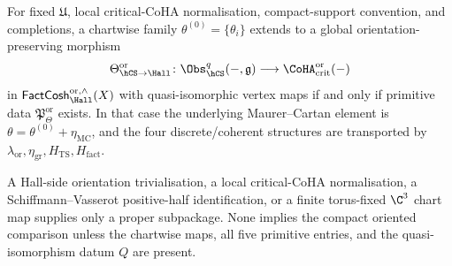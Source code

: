 \begin{theorem}
\label{thm:hcs-hall-primitive-criterion}
For fixed $\mathfrak U$, local critical-CoHA normalisation, compact-support
convention, and completions, a chartwise family
$\theta^{(0)}=\{\theta_i\}$ extends to a global orientation-preserving
morphism
\[
 \Theta_{\hCS\to\Hall}^{\mathrm{or}}\colon
 \Obs_{\hCS}^{q}(-,\mathfrak g)
 \longrightarrow
 \CoHA_{\mathrm{crit}}^{\mathrm{or}}(-)
\]
in $\mathsf{FactCosh}_{\Hall}^{\mathrm{or},\wedge}(X)$ with
quasi-isomorphic vertex maps if and only if primitive data
$\mathfrak P_{\Theta}^{\mathrm{or}}$ exists. In that case the underlying
Maurer--Cartan element is
$\theta=\theta^{(0)}+\eta_{\mathrm{MC}}$, and the four discrete/coherent
structures are transported by
$\lambda_{\mathrm{or}},\eta_{\mathrm{gr}},H_{\mathrm{TS}},H_{\mathrm{fact}}$.

A Hall-side orientation trivialisation, a local critical-CoHA
normalisation, a Schiffmann--Vasserot positive-half identification, or a
finite torus-fixed $\C^3$ chart map supplies only a proper subpackage.
None implies the compact oriented comparison unless the chartwise maps,
all five primitive entries, and the quasi-isomorphism datum $Q$ are
present.
\end{theorem}

